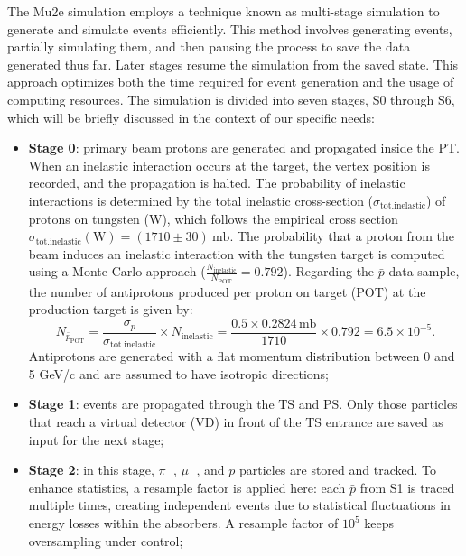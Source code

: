 The Mu2e simulation employs a technique known as multi-stage simulation 
to generate and simulate events efficiently. This method involves generating 
events, partially simulating them, and then pausing the process to save the 
data generated thus far. Later stages resume the simulation from the saved 
state. This approach optimizes both the time required for event generation 
and the usage of computing resources. The simulation is divided into seven 
stages, S0 through S6, which will be briefly discussed in the context of our specific needs:

\begin{itemize}
    \item \textbf{Stage 0}: primary beam protons are generated and propagated 
    inside the PT. When an inelastic interaction occurs at the target, the vertex 
    position is recorded, and the propagation is halted. The probability of 
    inelastic interactions is determined by the total inelastic cross-section 
    ($\sigma_{\text{tot.inelastic}}$) of protons on tungsten (W), which follows the 
    empirical cross section $\sigma_{\text{tot.inelastic}}(\text{W}) = (1710 \pm 30) \ \text{mb}$.
    The probability that a proton from the beam induces an inelastic interaction with the tungsten target is computed using a Monte Carlo approach 
    ($    \frac{N_{\text{inelastic}}}{N_{\text{POT}}} = 0.792$). Regarding the $\bar{p}$ 
    data sample, the number of antiprotons produced per proton on target (POT) at the production target is given by:
    $$
    N_{\bar{p}_{\text{POT}}} = \frac{\sigma_p}{\sigma_{\text{tot.inelastic}}} \times N_{\text{inelastic}} = \frac{0.5 \times 0.2824 \, \text{mb}}{1710} \times 0.792 = 6.5 \times 10^{-5}.
    $$
    Antiprotons are generated with a flat momentum distribution between 0 and 5 GeV/c and 
    are assumed to have isotropic directions;
    
    \item \textbf{Stage 1}: events are propagated through the TS and PS. 
    Only those particles that reach a virtual detector (VD) in front 
    of the TS entrance are saved as input for the next stage;

    \item \textbf{Stage 2}: in this stage, $\pi^-$, $\mu^-$, and $\bar{p}$ 
    particles are stored and tracked. To enhance statistics, a resample factor 
    is applied here: each $\bar{p}$ from S1 is traced multiple times, creating 
    independent events due to statistical fluctuations in energy losses within 
    the absorbers. A resample factor of $10^5$ keeps oversampling under control;


\end{itemize}
